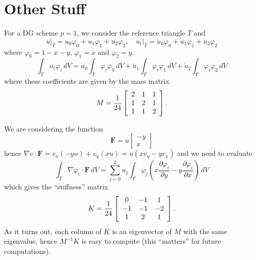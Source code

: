 \documentclass[letterpaper,10pt]{article}
\begin{document}
\section{Other Stuff}

For a DG scheme \(p = 1\), we consider the reference triangle \(T\) and
\[\left.u\right|_T = u_0 \varphi_0 + u_1 \varphi_1 + u_2 \varphi_2, \quad
\left.u_t\right|_T = \dot{u}_0 \varphi_0 + \dot{u}_1 \varphi_1 +
\dot{u}_2 \varphi_2\]
where \(\varphi_0 = 1 - x - y\), \(\varphi_1 = x\) and \(\varphi_2 = y\).
\[\int_{T} u_t \varphi_i \, dV =
\dot{u}_0 \int_{T} \varphi_i \varphi_0 \, dV +
\dot{u}_1 \int_{T} \varphi_i \varphi_1 \, dV +
\dot{u}_2 \int_{T} \varphi_i \varphi_2 \, dV\]
where these coefficients are given by the mass matrix
\[M = \frac{1}{24} \left[ \begin{array}{c c c}
2 & 1 & 1 \\
1 & 2 & 1 \\
1 & 1 & 2 \end{array}\right].\]

We are considering the function
\[\mathbf{F} = u \left[ \begin{array}{c} -y \\ x
\end{array}\right]\]
hence \(\nabla v \cdot \mathbf{F} = v_x(-yu) + v_y(xu) =
u(x v_y - y v_x)\) and we need to evaluate
\[\int_{T} \nabla \varphi_i \cdot \mathbf{F} \, dV =
\sum_{j = 0}^2 u_j \int_{T} \varphi_j \left(
x \frac{\partial \varphi_i}{\partial y} -
y \frac{\partial \varphi_i}{\partial x}\right) \, dV\]
which gives the ``stiffness'' matrix
\[K = \frac{1}{24} \left[ \begin{array}{c c c}
0 & -1 & 1 \\
-1 & -1 & -2 \\
1 & 2 & 1 \end{array}\right].\]
As it turns out, each column of \(K\) is an eigenvector of \(M\) with
the same eigenvalue, hence \(M^{-1} K\) is easy to compute
(this ``matters'' for future computations).
\end{document}
